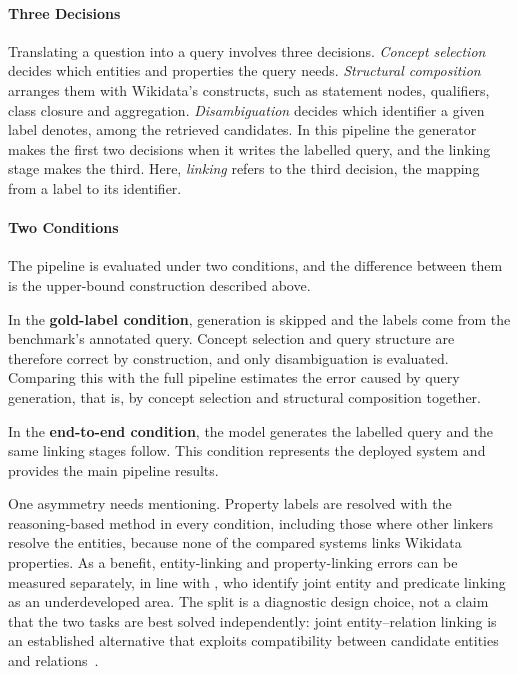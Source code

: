 \paragraph{Three Decisions}

Translating a question into a query involves three decisions.
\emph{Concept selection} decides which entities and properties the query needs.
\emph{Structural composition} arranges them with Wikidata's constructs, such as statement nodes, qualifiers, class closure and aggregation.
\emph{Disambiguation} decides which identifier a given label denotes, among the retrieved candidates.
In this pipeline the generator makes the first two decisions when it writes the labelled query, and the linking stage makes the third.
Here, \emph{linking} refers to the third decision, the mapping from a label to its identifier.

\paragraph{Two Conditions}

The pipeline is evaluated under two conditions, and the difference between them is the upper-bound construction described above.

In the \textbf{gold-label condition}, generation is skipped and the labels come from the benchmark's annotated query.
Concept selection and query structure are therefore correct by construction, and only disambiguation is evaluated.
Comparing this with the full pipeline estimates the error caused by query generation, that is, by concept selection and structural composition together.

In the \textbf{end-to-end condition}, the model generates the labelled query and the same linking stages follow.
This condition represents the deployed system and provides the main pipeline results.

One asymmetry needs mentioning. Property labels are resolved with the reasoning-based method in every condition, including those where other linkers resolve the entities, because none of the compared systems links Wikidata properties. As a benefit, entity-linking and property-linking errors can be measured separately, in line with \textcite{scharpf2026survey}, who identify joint entity and predicate linking as an underdeveloped area. The split is a diagnostic design choice, not a claim that the two tasks are best solved independently: joint entity–relation linking is an established alternative that exploits compatibility between candidate entities and relations~\citep{dubey2018earl}.

